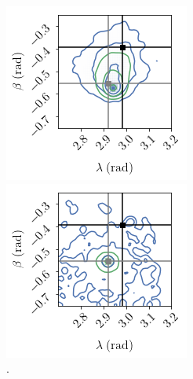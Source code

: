 \documentclass[aps,showpacs,twocolumn,prd,superscriptaddress,nofootinbib]{revtex4-1}
\begin{document}
\begin{figure}
  \centering
  \begin{minipage}{.49\linewidth}
  \includegraphics[width=.99\linewidth]{../plots/corner_skydown_smbh_case9_22_ptmcmc_bambi_withdegen.png}
  \end{minipage}
  \begin{minipage}{.49\linewidth}
  \includegraphics[width=.99\linewidth]{../plots/corner_skydown_smbh_case9_simplelike_ptmcmc_bambi_withdegen.png}
  \end{minipage}
  \caption{.}
  \label{fig:Skydownsmbh22hmSimpleLikeCase9}
\end{figure}
\end{document}
